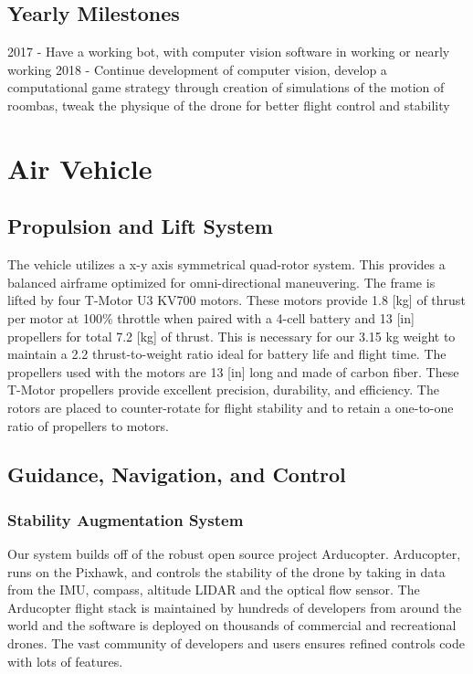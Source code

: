 \documentclass[12pt,letterpaper]{article}
\begin{document}
	\subsection{Yearly Milestones}
	2017 - Have a working bot, with computer vision software in working or nearly working
	2018 - Continue development of computer vision, develop a computational  game strategy through creation of simulations of the motion of roombas, tweak the physique of the drone for better flight control and stability





\section*{Air Vehicle}
	\subsection*{Propulsion and Lift System}
	        The vehicle utilizes a x-y axis symmetrical quad-rotor system. This provides a balanced airframe optimized for omni-directional maneuvering. The frame is lifted by four T-Motor U3 KV700 motors. These motors provide 1.8 [kg] of thrust per motor at 100\% throttle when paired with a 4-cell battery and 13 [in] propellers for total 7.2 [kg] of thrust. This is necessary for our 3.15 kg weight to maintain a 2.2 thrust-to-weight ratio ideal for battery life and flight time. 
			The propellers used with the motors are 13 [in] long and made of carbon fiber. These T-Motor propellers provide excellent precision, durability, and efficiency. The rotors are placed to counter-rotate for flight stability and to retain a one-to-one ratio of propellers to motors.



	\subsection*{Guidance, Navigation, and Control}
		\subsubsection*{Stability Augmentation System}
			Our system builds off of the robust open source project Arducopter.  Arducopter, runs on the Pixhawk, and controls the stability of the drone by taking in data from the IMU, compass, altitude LIDAR and the optical flow sensor. The Arducopter flight stack is maintained by hundreds of developers from around the world and the software is deployed on thousands of commercial and recreational drones.  The vast community of developers and users ensures refined controls code with lots of features. 
\end{document}
